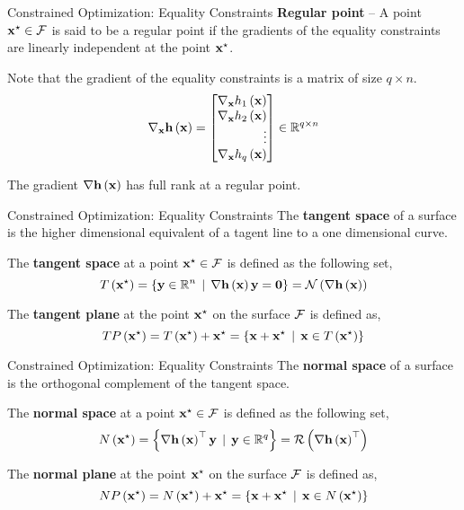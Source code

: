 \documentclass[aspectratio=169]{beamer}
\def\mf{\ensuremath\mathbf}
\def\mb{\ensuremath\mathbb}
\def\mc{\ensuremath\mathcal}
\def\lp{\ensuremath\left(}
\def\rp{\ensuremath\right)}
\def\lc{\ensuremath\left\{}
\def\rc{\ensuremath\right\}}
\def\bmx{\ensuremath\begin{bmatrix*}[r]}
\def\emx{\ensuremath\end{bmatrix*}}
\def\R{\ensuremath\mb{R}}
\newcommand{\ct}[1]{\lp #1\rp}
\begin{document}
\begin{frame}[t]{Constrained Optimization: Equality Constraints}
  \textbf{Regular point} -- A point $\mf{x}^{\star} \in \mc{F}$ is said to be a regular point if the gradients of the equality constraints are linearly independent at the point $\mf{x}^{\star}$.
  \vspace{0.2cm}
  
  Note that the gradient of the equality constraints is a matrix of size $q \times n$.
  \[ \nabla_{\mf{x}} \mf{h}\ct{\mf{x}} =  \bmx \nabla_{\mf{x}} h_1\ct{\mf{x}} \\ \nabla_{\mf{x}} h_2\ct{\mf{x}} \\ \vdots \\ \nabla_{\mf{x}} h_q\ct{\mf{x}}\emx \in \R^{q \times n} \]
  
  The gradient $\nabla \mf{h}\ct{\mf{x}}$ has full rank at a regular point.

\end{frame}


\begin{frame}[t]{Constrained Optimization: Equality Constraints}
  The \textbf{tangent space} of a surface is the higher dimensional equivalent of a tagent line to a one dimensional curve. 
  \vspace{0.2cm}

  The \textbf{tangent space} at a point $\mf{x}^\star \in \mc{F}$ is defined as the following set,
  \[ T\ct{\mf{x}^\star} = \lc \mf{y} \in \R^n \, \mid \, \nabla \mf{h}\ct{\mf{x}} \mf{y} = \mf{0} \rc = \mc{N}\ct{\nabla \mf{h}\ct{\mf{x}}} \]
  
  The \textbf{tangent plane} at the point $\mf{x}^\star$ on the surface $\mc{F}$ is defined as,
  \[ TP\ct{\mf{x}^\star} = T\ct{\mf{x}^\star} + \mf{x}^\star = \lc \mf{x} + \mf{x}^\star \, \mid \, \mf{x} \in T\ct{\mf{x}^\star} \rc \]
\end{frame}


\begin{frame}[t]{Constrained Optimization: Equality Constraints}
  The \textbf{normal space} of a surface is the orthogonal complement of the tangent space.  
  \vspace{0.2cm}

  The \textbf{normal space} at a point $\mf{x}^\star \in \mc{F}$ is defined as the following set,
  \[ N\ct{\mf{x}^\star} = \lc \nabla \mf{h}\ct{\mf{x}}^\top \mf{y} \, \mid \, \mf{y} \in \R^q \rc = \mc{R}\ct{\nabla \mf{h}\ct{\mf{x}}^\top } \]
  
  The \textbf{normal plane} at the point $\mf{x}^\star$ on the surface $\mc{F}$ is defined as,
  \[ NP\ct{\mf{x}^\star} = N\ct{\mf{x}^\star} + \mf{x}^\star = \lc \mf{x} + \mf{x}^\star \, \mid \, \mf{x} \in N\ct{\mf{x}^\star} \rc \]
\end{frame}
\end{document}
